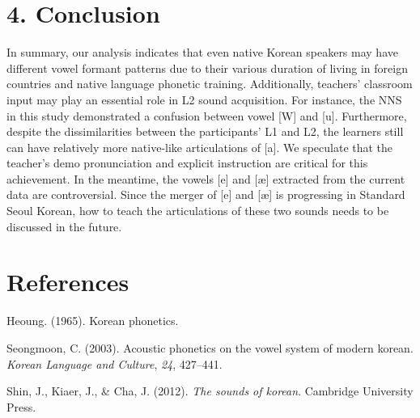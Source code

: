 \documentclass[man, fleqn, noextraspace]{apa6}
\begin{document}
\section{\texorpdfstring{\textbf{4.
Conclusion}}{4. Conclusion}}\label{conclusion}

In summary, our analysis indicates that even native Korean speakers may
have different vowel formant patterns due to their various duration of
living in foreign countries and native language phonetic training.
Additionally, teachers' classroom input may play an essential role in L2
sound acquisition. For instance, the NNS in this study demonstrated a
confusion between vowel {[}W{]} and {[}u{]}. Furthermore, despite the
dissimilarities between the participants' L1 and L2, the learners still
can have relatively more native-like articulations of {[}a{]}. We
speculate that the teacher's demo pronunciation and explicit instruction
are critical for this achievement. In the meantime, the vowels {[}e{]}
and {[}æ{]} extracted from the current data are controversial. Since the
merger of {[}e{]} and {[}æ{]} is progressing in Standard Seoul Korean,
how to teach the articulations of these two sounds needs to be discussed
in the future. \newpage

\section{\texorpdfstring{\textbf{References}}{References}}\label{references}

\begingroup
\setlength{\parindent}{-0.5in} \setlength{\leftskip}{0.5in}

\hypertarget{refs}{}
\hypertarget{ref-Heo1965}{}
Heoung. (1965). Korean phonetics.

\hypertarget{ref-Cho2003}{}
Seongmoon, C. (2003). Acoustic phonetics on the vowel system of modern
korean. \emph{Korean Language and Culture}, \emph{24}, 427--441.

\hypertarget{ref-Shin2012}{}
Shin, J., Kiaer, J., \& Cha, J. (2012). \emph{The sounds of korean}.
Cambridge University Press.

\endgroup
\end{document}
